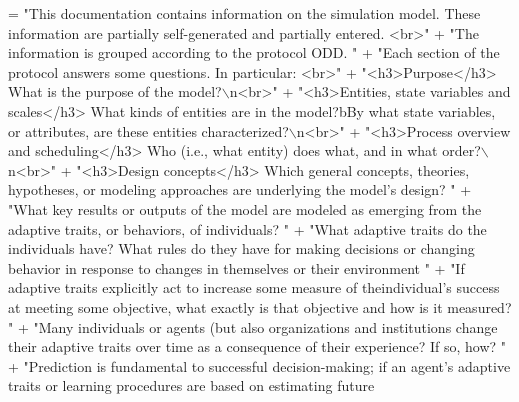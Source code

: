 \begin{DoxyCode}
= \textcolor{stringliteral}{"This documentation contains information on the simulation model. These information are partially
       self-generated and partially entered. <br>"} 
                                             + \textcolor{stringliteral}{"The information is grouped according to the protocol ODD. "}
                                             + \textcolor{stringliteral}{"Each section of the protocol answers some questions. In
       particular: <br>"}
                                             + \textcolor{stringliteral}{"<h3>Purpose</h3> What is the purpose of the model?\(\backslash\)n<br>"}
                                             + \textcolor{stringliteral}{"<h3>Entities, state variables and scales</h3> What kinds of
       entities are in the model?bBy what state variables, or attributes, are these entities characterized?\(\backslash\)n<br>"}
                                             + \textcolor{stringliteral}{"<h3>Process overview and scheduling</h3> Who (i.e., what
       entity) does what, and in what order?\(\backslash\)n<br>"}
                                             + \textcolor{stringliteral}{"<h3>Design concepts</h3> Which general concepts, theories,
       hypotheses, or modeling approaches are underlying the model's design? "}
                                             +                            \textcolor{stringliteral}{"What key results or outputs of
       the model are modeled as emerging from the adaptive traits, or behaviors, of individuals? "}   
                                             +                            \textcolor{stringliteral}{"What adaptive traits do the
       individuals have? What rules do they have for making decisions or changing behavior in response to changes in
       themselves or their environment "}
                                             +                            \textcolor{stringliteral}{"If adaptive traits explicitly
       act to increase some measure of theindividual's success at meeting some objective, what exactly is that
       objective and how is it measured? "}
                                             +                            \textcolor{stringliteral}{"Many individuals or agents (but
       also organizations and institutions change their adaptive traits over time as a consequence of their
       experience? If so, how? "}
                                             +                            \textcolor{stringliteral}{"Prediction is fundamental to
       successful decision-making; if an agent's adaptive traits or learning procedures are based on estimating future
}
\end{DoxyCode}
